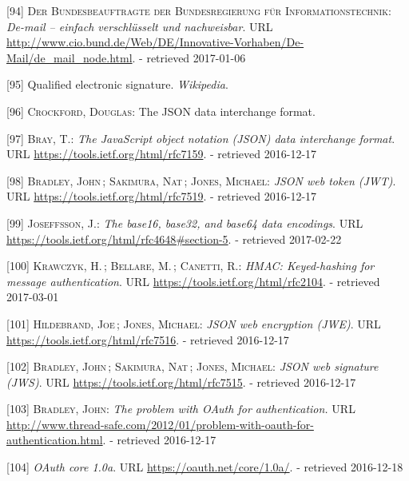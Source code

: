 \documentclass[12pt,english,a4paper,titlepage,cleardoublepage=empty,dottedtoc]{report}
\begin{document}
\hypertarget{ref-web_2017_about-de-mail}{}
{[}94{]} \textsc{Der Bundesbeauftragte der Bundesregierung für
Informationstechnik}: \emph{De-mail -- einfach verschlüsselt und
nachweisbar}. URL
\url{http://www.cio.bund.de/Web/DE/Innovative-Vorhaben/De-Mail/de_mail_node.html}.
- retrieved 2017-01-06

\hypertarget{ref-web_2017_wikipedia_qes}{}
{[}95{]} Qualified electronic signature. \emph{Wikipedia}.

\hypertarget{ref-web_spec_json}{}
{[}96{]} \textsc{Crockford, Douglas}: The JSON data interchange format.

\hypertarget{ref-web_rfc_json}{}
{[}97{]} \textsc{Bray, T.}: \emph{The JavaScript object notation (JSON)
data interchange format}. URL \url{https://tools.ietf.org/html/rfc7159}.
- retrieved 2016-12-17

\hypertarget{ref-web_spec_json-web-token}{}
{[}98{]} \textsc{Bradley, John}\,; \textsc{Sakimura, Nat}\,;
\textsc{Jones, Michael}: \emph{JSON web token (JWT)}. URL
\url{https://tools.ietf.org/html/rfc7519}. - retrieved 2016-12-17

\hypertarget{ref-web_spec_base64url}{}
{[}99{]} \textsc{Joseffsson, J.}: \emph{The base16, base32, and base64
data encodings}. URL
\url{https://tools.ietf.org/html/rfc4648\#section-5}. - retrieved
2017-02-22

\hypertarget{ref-web_spec_hmac}{}
{[}100{]} \textsc{Krawczyk, H.}\,; \textsc{Bellare, M.}\,;
\textsc{Canetti, R.}: \emph{HMAC: Keyed-hashing for message
authentication}. URL \url{https://tools.ietf.org/html/rfc2104}. -
retrieved 2017-03-01

\hypertarget{ref-web_spec_json-web-encryption}{}
{[}101{]} \textsc{Hildebrand, Joe}\,; \textsc{Jones, Michael}:
\emph{JSON web encryption (JWE)}. URL
\url{https://tools.ietf.org/html/rfc7516}. - retrieved 2016-12-17

\hypertarget{ref-web_spec_json-web-signature}{}
{[}102{]} \textsc{Bradley, John}\,; \textsc{Sakimura, Nat}\,;
\textsc{Jones, Michael}: \emph{JSON web signature (JWS)}. URL
\url{https://tools.ietf.org/html/rfc7515}. - retrieved 2016-12-17

\hypertarget{ref-web_2012_problem-with-oauth-for-authentication}{}
{[}103{]} \textsc{Bradley, John}: \emph{The problem with OAuth for
authentication.} URL
\url{http://www.thread-safe.com/2012/01/problem-with-oauth-for-authentication.html}.
- retrieved 2016-12-17

\hypertarget{ref-web_spec_oauth-1a}{}
{[}104{]} \emph{OAuth core 1.0a}. URL
\url{https://oauth.net/core/1.0a/}. - retrieved 2016-12-18
\end{document}
